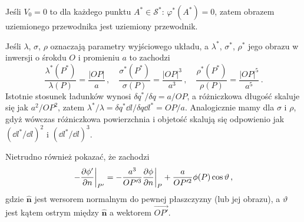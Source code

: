 \documentclass[../main.tex]{subfiles}
\begin{document}
\medskip

Jeśli \(V_0=0\) to dla każdego punktu \(A^*\in\mathcal{S}^*\): \(\varphi^*(A^*)=0\), zatem obrazem
uziemionego przewodnika jest uziemiony przewodnik.
\medskip

Jeśli \(\lambda\), \(\sigma\), \(\rho\) oznaczają parametry wyjściowego układu, a \(\lambda^*\),
\(\sigma^*\), \(\rho^*\) jego obrazu w inwersji o śrokdu \(O\) i promieniu \(a\) to zachodzi
\begin{equation*}
    \frac{\lambda^*(P^*)}{\lambda(P)}=\frac{|OP|}{a}\,,\quad\frac{\sigma^*(P^*)}{\sigma(P)}=\frac{|OP|^3}{a^3}\,,\quad \frac{\rho^*(P^*)}{\rho(P)}=\frac{|OP|^5}{a^5}\,.
\end{equation*}
Istotnie stosunek ładunków wynosi \(\delta q^*/\delta q=a/OP\), a różniczkowa długość skaluje się
jak \(a^2/OP^2\), zatem \(\lambda^*/\lambda=\delta q^*\dd{l}/\delta q\dd{l^*}=OP/a\). Analogicznie
mamy dla \(\sigma\) i \(\rho\), gdyż wówczas różniczkowa powierzchnia i objetość skalują się
odpowienio jak \((\dd{l^*}/\dd{l})^2\) i \((\dd{l^*}/\dd{l})^3\).
\medskip

Nietrudno również pokazać, że zachodzi
\begin{equation*}
    -\pdv{\phi'}{n}\bigg|_{P'}=-\frac{a^3}{OP'^3}\pdv{\phi}{n}\bigg|_{P}+\frac{a}{OP'^2}\phi(P)\cos\vartheta\,,
\end{equation*}
gdzie \(\mathbf{\hat{n}}\) jest wersorem normalnym do pewnej płaszczyzny (lub jej obrazu), a
\(\vartheta\) jest kątem ostrym między \(\mathbf{\hat{n}}\) a wektorem \(\overrightarrow{OP'}\).
\end{document}
